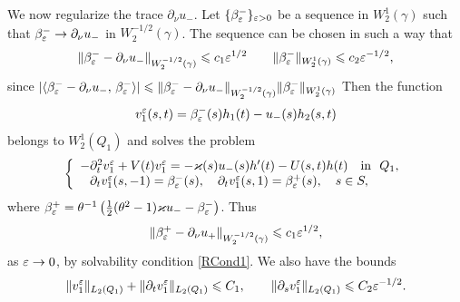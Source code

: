 We now regularize the trace $\partial_\nu u_-$.  Let $\{\beta_\varepsilon^-\}_{\varepsilon>0}$ be a sequence in $W_2^{1}(\gamma)$ such that $\beta_\varepsilon^-\to  \partial_\nu u_-$ in  $W_2^{-1/2}(\gamma)$.
The sequence can be chosen in such a way that
\begin{equation}\label{EstBetaEps}
  \|\beta_\varepsilon^--\partial_\nu u_-\|_{W_2^{-1/2}(\gamma)}\leqslant c_1 \varepsilon^{1/2}\qquad   \|\beta_\varepsilon^-\|_{W_2^1(\gamma)}\leqslant c_2 \varepsilon^{-1/2},
\end{equation}
since $|\langle\beta_\varepsilon^--\partial_\nu u_-,\,\beta_\varepsilon^-\rangle|\leqslant
\|\beta_\varepsilon^--\partial_\nu u_-\|_{W_2^{-1/2}(\gamma)}\|\beta_\varepsilon^-\|_{W_2^{1}(\gamma)}
$
Then the function
\begin{equation}\label{representV1Eps}
    v_1^\varepsilon(s,t)= \beta_\varepsilon^-(s)h_1(t)-u_-(s)h_2(s,t)
\end{equation}
belongs to $W_2^1(Q_1)$ and solves the problem
\begin{equation}\label{ProblemV1eps}
\left\{
  \begin{array}{ll}
    -\partial_t^2 v_1^\varepsilon+V(t)v_1^\varepsilon=-\varkappa(s)u_-(s)h'(t)-U(s,t)h(t)\quad \hbox{in \ } Q_1, \\
    \phantom{-}\partial_t v_1^\varepsilon(s, -1)=\beta_\varepsilon^-(s), \quad
\partial_t v_1^\varepsilon(s, 1)=\beta_\varepsilon^+(s),\quad s\in S,
  \end{array}
\right.
\end{equation}
where $ \beta_\varepsilon^+=\theta^{-1}
\left(\textstyle\frac{1}{2 }(\theta^2-1)\varkappa u_--\beta_\varepsilon^-\right)$.
Thus
\begin{equation}\label{BetaEpsPlus}
  \|\beta_\varepsilon^+-\partial_\nu u_+\|_{W_2^{-1/2}(\gamma)}\leqslant c_1 \varepsilon^{1/2},
\end{equation}
as $\varepsilon\to 0$, by solvability condition \eqref{RCond1}. We also have the bounds
\begin{equation}\label{DerivOfV1Bounds}
  \|v_1^\varepsilon\|_{L_2(Q_1)}+ \|\partial_t v_1^\varepsilon\|_{L_2(Q_1)}\leqslant C_1,
   \qquad\|\partial_s v_1^\varepsilon\|_{L_2(Q_1)}\leqslant C_2\varepsilon^{-1/2}.
\end{equation}




















